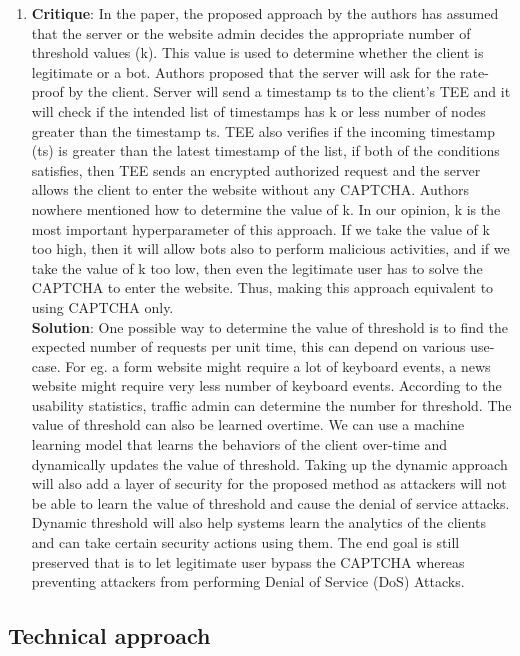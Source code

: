 \begin{enumerate}
	\item \textbf{Critique}: In the paper, the proposed approach by the authors has assumed that the server or the website admin decides the appropriate number of threshold values (k). This value is used to determine whether the client is legitimate or a bot. Authors proposed that the server will ask for the rate-proof by the client. Server will send a timestamp ts to the client’s TEE and it will check if the intended list of timestamps has k or less number of nodes greater than the timestamp ts. TEE also verifies if the incoming timestamp (ts) is greater than the latest timestamp of the list, if both of the conditions satisfies, then TEE sends an encrypted authorized request and the server allows the client to enter the website without any CAPTCHA. Authors nowhere mentioned how to determine the value of k. In our opinion, k is the most important hyperparameter of this approach. If we take the value of k too high, then it will allow bots also to perform malicious activities, and if we take the value of k too low, then even the legitimate user has to solve the CAPTCHA to enter the website. Thus, making this approach equivalent to using CAPTCHA only.\\

	\textbf{Solution}: One possible way to determine the value of threshold is to find the expected number of requests per unit time, this can depend on various use-case. For eg. a form website might require a lot of keyboard events, a news website might require very less number of keyboard events. According to the usability statistics, traffic admin can determine the number for threshold. The value of threshold can also be learned overtime. We can use a machine learning model that learns the behaviors of the client over-time and dynamically updates the value of threshold. Taking up the dynamic approach will also add a layer of security for the proposed method as attackers will not be able to learn the value of threshold and cause the denial of service attacks. Dynamic threshold will also help systems learn the analytics of the clients and can take certain security actions using them. The end goal is still preserved that is to let legitimate user bypass the CAPTCHA whereas preventing attackers from performing Denial of Service (DoS) Attacks.\\


\end{enumerate}

\subsection{Technical approach}

